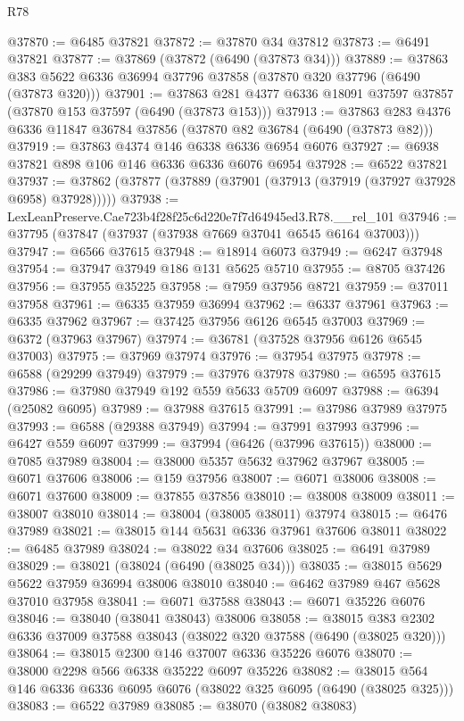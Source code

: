 \begin{lexlean}{R78}
\begin{coremodule}
@37870 := @6485 @37821
@37872 := @37870 @34 @37812
@37873 := @6491 @37821
@37877 := @37869 (@37872 (@6490 (@37873 @34)))
@37889 := @37863 @383 @5622 @6336 @36994 @37796 @37858 (@37870 @320 @37796 (@6490 (@37873 @320)))
@37901 := @37863 @281 @4377 @6336 @18091 @37597 @37857 (@37870 @153 @37597 (@6490 (@37873 @153)))
@37913 := @37863 @283 @4376 @6336 @11847 @36784 @37856 (@37870 @82 @36784 (@6490 (@37873 @82)))
@37919 := @37863 @4374 @146 @6338 @6336 @6954 @6076
@37927 := @6938 @37821 @898 @106 @146 @6336 @6336 @6076 @6954
@37928 := @6522 @37821
@37937 := @37862 (@37877 (@37889 (@37901 (@37913 (@37919 (@37927 @37928 @6958) @37928)))))
@37938 := LexLeanPreserve.Cae723b4f28f25c6d220e7f7d64945ed3.R78.__rel_101
@37946 := @37795 (@37847 (@37937 (@37938 @7669 @37041 @6545 @6164 @37003)))
@37947 := @6566 @37615
@37948 := @18914 @6073
@37949 := @6247 @37948
@37954 := @37947 @37949 @186 @131 @5625 @5710
@37955 := @8705 @37426
@37956 := @37955 @35225
@37958 := @7959 @37956 @8721
@37959 := @37011 @37958
@37961 := @6335 @37959 @36994
@37962 := @6337 @37961
@37963 := @6335 @37962
@37967 := @37425 @37956 @6126 @6545 @37003
@37969 := @6372 (@37963 @37967)
@37974 := @36781 (@37528 @37956 @6126 @6545 @37003)
@37975 := @37969 @37974
@37976 := @37954 @37975
@37978 := @6588 (@29299 @37949)
@37979 := @37976 @37978
@37980 := @6595 @37615
@37986 := @37980 @37949 @192 @559 @5633 @5709 @6097
@37988 := @6394 (@25082 @6095)
@37989 := @37988 @37615
@37991 := @37986 @37989 @37975
@37993 := @6588 (@29388 @37949)
@37994 := @37991 @37993
@37996 := @6427 @559 @6097
@37999 := @37994 (@6426 (@37996 @37615))
@38000 := @7085 @37989
@38004 := @38000 @5357 @5632 @37962 @37967
@38005 := @6071 @37606
@38006 := @159 @37956
@38007 := @6071 @38006
@38008 := @6071 @37600
@38009 := @37855 @37856
@38010 := @38008 @38009
@38011 := @38007 @38010
@38014 := @38004 (@38005 @38011) @37974
@38015 := @6476 @37989
@38021 := @38015 @144 @5631 @6336 @37961 @37606 @38011
@38022 := @6485 @37989
@38024 := @38022 @34 @37606
@38025 := @6491 @37989
@38029 := @38021 (@38024 (@6490 (@38025 @34)))
@38035 := @38015 @5629 @5622 @37959 @36994 @38006 @38010
@38040 := @6462 @37989 @467 @5628 @37010 @37958
@38041 := @6071 @37588
@38043 := @6071 @35226 @6076
@38046 := @38040 (@38041 @38043) @38006
@38058 := @38015 @383 @2302 @6336 @37009 @37588 @38043 (@38022 @320 @37588 (@6490 (@38025 @320)))
@38064 := @38015 @2300 @146 @37007 @6336 @35226 @6076
@38070 := @38000 @2298 @566 @6338 @35222 @6097 @35226
@38082 := @38015 @564 @146 @6336 @6336 @6095 @6076 (@38022 @325 @6095 (@6490 (@38025 @325)))
@38083 := @6522 @37989
@38085 := @38070 (@38082 @38083)

\end{coremodule}
\end{lexlean}

